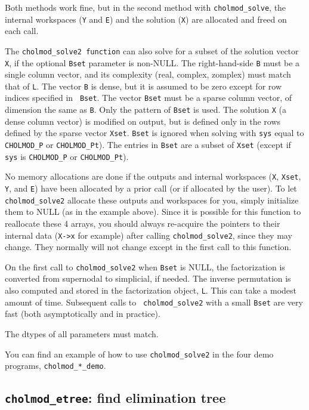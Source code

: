 \documentclass[11pt]{article}
\begin{document}
Both methods work fine, but in the second method with {\tt cholmod\_solve}, the
internal workspaces ({\tt Y} and {\tt E}) and the solution ({\tt X}) are
allocated and freed on each call.

The {\tt cholmod\_solve2 function} can also solve for a subset of the solution
vector {\tt X}, if the optional {\tt Bset} parameter is non-NULL.  The
right-hand-side {\tt B} must be a single column vector, and its complexity
(real, complex, zomplex) must match that of {\tt L}.  The vector {\tt B} is
dense, but it is assumed to be zero except for row indices specified in {\tt
Bset}.  The vector {\tt Bset} must be a sparse column vector, of dimension the
same as {\tt B}.  Only the pattern of {\tt Bset} is used.  The solution {\tt X}
(a dense column vector) is modified on output, but is defined only in the rows
defined by the sparse vector {\tt Xset}.  {\tt Bset} is ignored when solving
with {\tt sys} equal to {\tt CHOLMOD\_P} or {\tt CHOLMOD\_Pt}).  The entries in
{\tt Bset} are a subset of {\tt Xset} (except if {\tt sys} is {\tt CHOLMOD\_P}
or {\tt CHOLMOD\_Pt}).

No memory allocations are done if the outputs and internal workspaces ({\tt X},
{\tt Xset}, {\tt Y}, and {\tt E}) have been allocated by a prior call (or if
allocated by the user).  To let {\tt cholmod\_solve2} allocate these outputs
and workspaces for you, simply initialize them to NULL (as in the example
above).  Since it is possible for this function to reallocate these 4 arrays,
you should always re-acquire the pointers to their internal data ({\tt X->x}
for example) after calling {\tt cholmod\_solve2}, since they may change.  They
normally will not change except in the first call to this function.

On the first call to {\tt cholmod\_solve2} when {\tt Bset} is NULL, the
factorization is converted from supernodal to simplicial, if needed.  The
inverse permutation is also computed and stored in the factorization object,
{\tt L}.  This can take a modest amount of time.  Subsequent calls to {\tt
cholmod\_solve2} with a small {\tt Bset} are very fast (both asymptotically and
in practice).

The dtypes of all parameters must match.

You can find an example of how to use {\tt cholmod\_solve2} in the
four demo programs, {\tt cholmod\_*\_demo}.

\subsection{{\tt cholmod\_etree}: find elimination tree}
\end{document}
